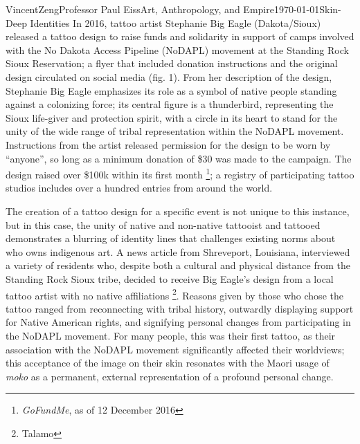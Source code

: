 \documentclass[12pt]{article}
\begin{document}
\begin{mla}{Vincent}{Zeng}{Professor Paul Eiss}{Art, Anthropology, and
  Empire}{\today}{Skin-Deep Identities}
In 2016, tattoo artist Stephanie Big Eagle (Dakota/Sioux) released a tattoo
design to raise funds and solidarity in support of camps involved with the No
Dakota Access Pipeline (NoDAPL) movement at the Standing Rock Sioux Reservation;
a flyer that included donation instructions and the original design circulated
on social media (fig.  1). From her description of the design, Stephanie Big
Eagle emphasizes its role as a symbol of native people standing against a
colonizing force; its central figure is a thunderbird, representing the Sioux
life-giver and protection spirit, with a circle in its heart to stand for the
unity of the wide range of tribal representation within the NoDAPL movement.
Instructions from the artist released permission for the design to be worn by
``anyone'', so long as a minimum donation of \$30 was made to the campaign.
The design raised over \$100k within its first month
\footnote{\textit{GoFundMe}, as of 12 December 2016}; a registry of
participating tattoo studios includes over a hundred entries from around the world.

The creation of a tattoo design for a specific event is not unique to this
instance, but in this case, the unity of native and non-native tattooist and
tattooed demonstrates a blurring of identity lines that challenges existing
norms about who owns indigenous art. A news article from Shreveport,
Louisiana, interviewed a variety of residents who, despite both a cultural
and physical distance from the Standing Rock Sioux tribe, decided to receive Big
Eagle's design from a local tattoo artist with no native affiliations
\footnote{Talamo}. Reasons given by those who chose the tattoo ranged from
reconnecting with tribal history, outwardly displaying support for Native
American rights, and signifying personal changes from participating in the
NoDAPL movement. For many people, this was their first tattoo, as their
association with the NoDAPL movement significantly affected their worldviews; this acceptance
of the image on their skin resonates with the Maori usage of \textit{moko} as a
permanent, external representation of a profound personal change.


\end{mla}
\end{document}
